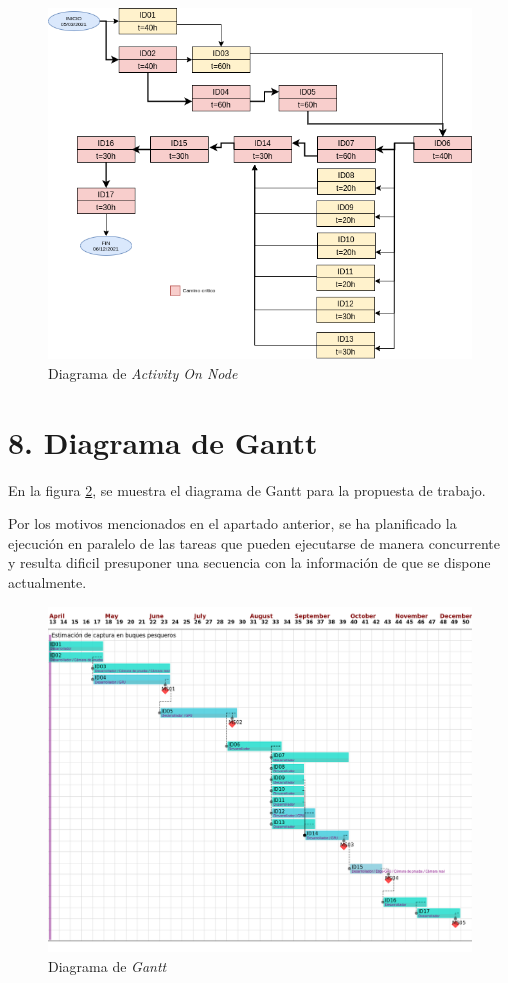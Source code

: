 \documentclass[11pt]{charter}
\begin{document}
\begin{figure}[htpb]
\centering 
\includegraphics[width=1.\textwidth]{./Figuras/aon.png}
\caption{Diagrama de \textit{Activity On Node}}
\label{fig:aon}
\end{figure}

\section{8. Diagrama de Gantt}
\label{sec:gantt}

En la figura \ref{fig:gantt}, se muestra el diagrama de Gantt para la propuesta de trabajo. 

Por los motivos mencionados en el apartado anterior, se ha planificado la ejecución en paralelo de las tareas que pueden ejecutarse de manera concurrente y resulta dificil presuponer una secuencia con la información de que se dispone actualmente.

\begin{figure}[htpb]
\centering 
\includegraphics[width=1.\textwidth]{./Figuras/gantt.png}
\caption{Diagrama de \textit{Gantt}}
\label{fig:gantt}
\end{figure}
\end{document}
